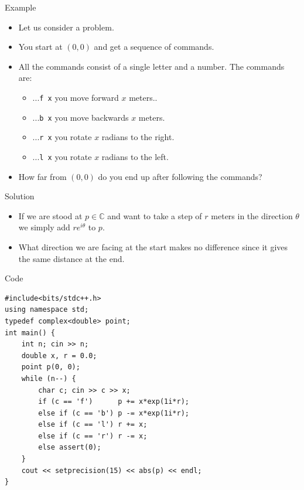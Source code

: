 \documentclass{beamer}
\begin{document}
\begin{frame}[plain]{Example}
	\begin{itemize}
        \item Let us consider a problem.
        \item You start at $(0, 0)$ and get a sequence of commands.
        \item All the commands consist of a single letter and a number. The commands are:
		\begin{itemize}
			\item ...\texttt{f x} you move forward $x$ meters..
			\item ...\texttt{b x} you move backwards $x$ meters.
			\item ...\texttt{r x} you rotate $x$ radians to the right.
			\item ...\texttt{l x} you rotate $x$ radians to the left.
        \end{itemize}
        \item How far from $(0, 0)$ do you end up after following the commands?
    \end{itemize}
\end{frame}

\begin{frame}[plain]{Solution}
	\begin{itemize}
        \item If we are stood at $p \in \mathbb{C}$ and want to take a step of $r$ meters in the direction $\theta$ we simply add $re^{i\theta}$ to $p$.
        \item What direction we are facing at the start makes no difference since it gives the same distance at the end.
    \end{itemize}
\end{frame}

\begin{frame}{Code}
\small
    \begin{verbatim}
#include<bits/stdc++.h>
using namespace std;
typedef complex<double> point;
int main() {
    int n; cin >> n;
    double x, r = 0.0;
    point p(0, 0);
    while (n--) {
        char c; cin >> c >> x;
        if (c == 'f')      p += x*exp(1i*r);
        else if (c == 'b') p -= x*exp(1i*r);
        else if (c == 'l') r += x;
        else if (c == 'r') r -= x;
        else assert(0);
	}
    cout << setprecision(15) << abs(p) << endl;
}
    \end{verbatim}
\end{frame}
\end{document}
